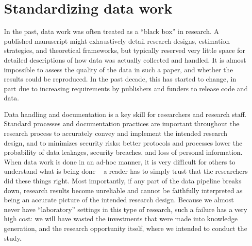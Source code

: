 
\section{Standardizing data work}

In the past, data work was often treated as a ``black box'' in research.
A published manuscript might exhaustively detail
research designs, estimation strategies, and theoretical frameworks,
but typically reserved very little space for detailed descriptions
of how data was actually collected and handled.
It is almost impossible to assess the quality of the data in such a paper,
and whether the results could be reproduced.
In the past decade, this has started to change,
in part due to increasing requirements by publishers and funders to release code and data.

Data handling and documentation is a key skill for researchers and research staff.
Standard processes and documentation practices
are important throughout the research process to accurately convey
and implement the intended research design,
and to minimizes security risks: 
better protocols and processes lower the probability of data leakages, 
security breaches, and loss of personal information.
When data work is done in an ad-hoc manner,
it is very difficult for others to understand what is being done --
a reader has to simply trust that the researchers did these things right.
Most importantly, if any part of the data pipeline breaks down,
research results become unreliable
and cannot be faithfully interpreted
as being an accurate picture of the intended research design.
Because we almost never have ``laboratory'' settings
in this type of research,
such a failure has a very high cost:
we will have wasted the investments that were made into knowledge generation,
and the research opportunity itself,
where we intended to conduct the study.

